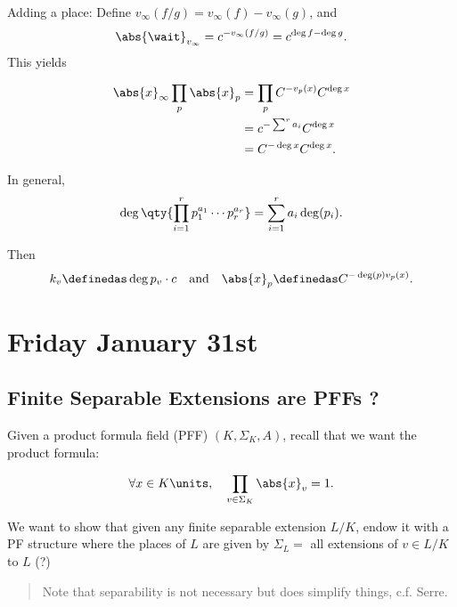 Adding a place: Define \(v_\infty(f/g) = v_\infty(f) - v_\infty(g)\),
and
\begin{align*}
\abs{\wait}_{v_\infty} = c^{-v_\infty(f/g)} = c^{\deg f - \deg g}
.\end{align*} This yields

\begin{align*}
\abs{x}_\infty \prod_p \abs{x}_p 
&= \prod_p C^{-v_p(x)} C^{\deg x} \\
&= c^{-\sum^r a_i} C^{\deg x} \\
&= C^{-\deg x}C^{\deg x}
.\end{align*}

In general,
\begin{align*}
\deg\qty{\prod_{i=1}^r p_1^{a_1} \cdots p_r^{a_r}} = \sum_{i=1}^r a_i \deg(p_i)
.\end{align*}

Then
\begin{align*}
k_v \definedas \deg p_v \cdot c \quad\text{and}\quad \abs{x}_p \definedas C^{-\deg(p) v_p(x)}
.\end{align*}

\hypertarget{friday-january-31st}{%
\section{Friday January 31st}\label{friday-january-31st}}

\hypertarget{finite-separable-extensions-are-pffs}{%
\subsection{Finite Separable Extensions are PFFs
?}\label{finite-separable-extensions-are-pffs}}

Given a product formula field (PFF) \((K, \Sigma_K, A)\), recall that we
want the product formula:

\begin{align*}
\forall x\in K\units,\quad \prod_{v\in \Sigma_K} \abs{x}_v = 1
.\end{align*}

We want to show that given any finite separable extension \(L/K\), endow
it with a PF structure where the places of \(L\) are given by
\(\Sigma_L =\) all extensions of \(v\in L/K\) to \(L\) (?)

\begin{quote}
Note that separability is not necessary but does simplify things, c.f.
Serre.
\end{quote}

